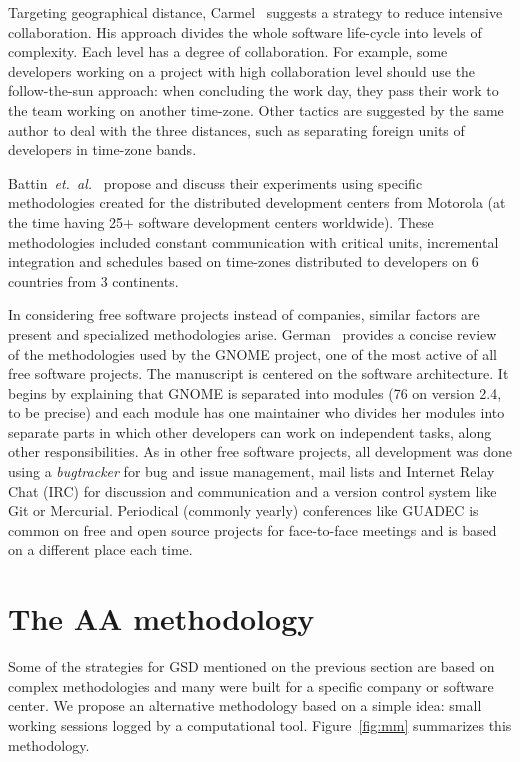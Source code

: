 \documentclass{article}
\newcommand{\etal}{{\it et.~al.}}
\begin{document}
Targeting geographical distance, Carmel~\cite{carmel2001} suggests a
strategy to reduce intensive collaboration. His approach divides the
whole software life-cycle into levels of complexity. Each level has a
degree of collaboration. For example, some developers working on a
project with high collaboration level should use the follow-the-sun
approach: when concluding the work day, they pass their work to the
team working on another time-zone. Other tactics are suggested by the
same author to deal with the three distances, such as separating foreign
units of developers in time-zone bands.

Battin~\etal~\cite{battin2001} propose and discuss their experiments using
specific methodologies created for the distributed development centers from
Motorola (at the time having 25+ software development centers worldwide). These
methodologies included constant communication with critical units, incremental
integration and schedules based on time-zones distributed to developers on 6
countries from 3 continents.

In considering free software projects instead of companies,
similar factors are present and specialized methodologies
arise. German~\cite{german2003} provides a concise review of
the methodologies used by the GNOME project, one of the most active of all free
software projects. The manuscript is centered on the software architecture. It
begins by explaining that GNOME is separated into modules (76 on version 2.4, to be
precise) and each module has one maintainer who divides her modules into
separate parts in which other developers can work on independent tasks, along
other responsibilities. As in other free software projects, all 
development was done using a \emph{bugtracker} for bug and issue management,
mail lists and Internet Relay Chat (IRC) for discussion and communication and a
version control system like Git or Mercurial. Periodical (commonly yearly)
conferences like GUADEC is common on free and open source projects for
face-to-face meetings and is based on a different place each time.


\section{The AA methodology}
\label{aa-methodology}

Some of the strategies for GSD mentioned on the previous section are based on
complex methodologies and many were built for a specific company or software
center. We propose an alternative methodology based on a simple idea: small
working sessions logged by a computational tool. Figure~\ref{fig:mm} summarizes
this methodology.
\end{document}

